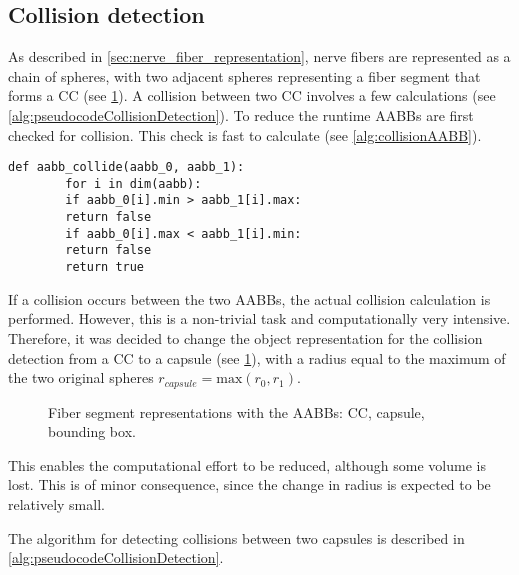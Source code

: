 \subsection{Collision detection}
\label{sec:collisionDetection}
% 
As described in \cref{sec:nerve_fiber_representation}, nerve fibers are represented as a chain of spheres, with two adjacent spheres representing a fiber segment that forms a \ac{CC} (see \cref{fig:conical_capsule}).
A collision between two \ac{CC} involves a few calculations (see \cref{alg:pseudocodeCollisionDetection}).
To reduce the runtime \acp{AABB} are first checked for collision.
This check is fast to calculate (see \cref{alg:collisionAABB}).
\begin{lstfloat}[!tb]
    \lstset{style=python}
    \begin{lstlisting}[]
        def aabb_collide(aabb_0, aabb_1):
        for i in dim(aabb):
        if aabb_0[i].min > aabb_1[i].max:
        return false
        if aabb_0[i].max < aabb_1[i].min:
        return false
        return true
    \end{lstlisting}
    \caption[]{Calculation if a collision between \acp{AABB} exists.}
    \label{alg:collisionAABB}
\end{lstfloat}
% 
% 
If a collision occurs between the two \acp{AABB}, the actual collision calculation is performed.
However, this is a non-trivial task and computationally very intensive.
Therefore, it was decided to change the object representation for the collision detection from a \ac{CC} to a capsule (see \cref{fig:conical_capsule}), with a radius equal to the maximum of the two original spheres $r_{\mathit{capsule}} = \mathrm{max}(r_0, r_1)$.
%
\begin{figure}[!t]
    \centering
    \setlength{\tikzwidth}{0.6\textwidth}
    \tikzset{external/export=false}
    \caption[]{Fiber segment representations with the \acp{AABB}: \raisebox{.25em}{\tikz \draw[black](0,0)--(0.275,0);} \ac{CC}, \raisebox{.25em}{\tikz \draw[blue, dash pattern=on 2.5pt off 2.5pt](0,0)--(0.275,0);} capsule, \raisebox{.25em}{\tikz \draw[red, dash pattern={on 2.5pt off 0.9pt on 0.42pt off 0.9pt}](0,0)--(0.275,0);} bounding box.}
    \label{fig:conical_capsule}
\end{figure}
% 
This enables the computational effort to be reduced, although some volume is lost.
This is of minor consequence, since the change in radius is expected to be relatively small.
\par
% 
The algorithm for detecting collisions between two capsules is described in \cref{alg:pseudocodeCollisionDetection}.
